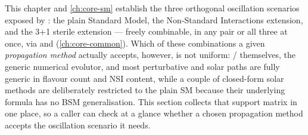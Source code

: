 This chapter and \cref{ch:core-sm} establish the three orthogonal
oscillation scenarios exposed by : the plain
Standard Model, the Non-Standard Interactions extension, and the 3+1
sterile extension --- freely combinable, in any pair or all three at once,
via  and 
(\cref{ch:core-common}). Which of these combinations a given
\emph{propagation method} actually accepts, however, is not uniform:
 /  themselves, the
generic numerical evolutor, and most perturbative and solar paths are fully
generic in flavour count and NSI content, while a couple of closed-form
solar methods are deliberately restricted to the plain SM because their
underlying formula has no BSM generalisation. This section collects that
support matrix in one place, so a caller can check at a glance whether a
chosen propagation method accepts the oscillation scenario it needs.

